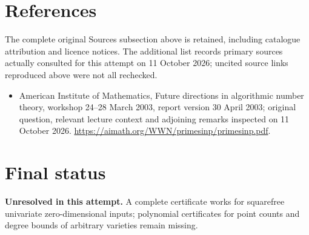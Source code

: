 \documentclass[11pt]{article}
\begin{document}
\section{References}
The complete original Sources subsection above is retained, including catalogue attribution and licence notices. The additional list records primary sources actually consulted for this attempt on 11 October 2026; uncited source links reproduced above were not all rechecked.
\begin{itemize}
\item American Institute of Mathematics, Future directions in algorithmic number theory, workshop 24--28 March 2003, report version 30 April 2003; original question, relevant lecture context and adjoining remarks inspected on 11 October 2026. \url{https://aimath.org/WWN/primesinp/primesinp.pdf}.
\end{itemize}
\section{Final status}
\textbf{Unresolved in this attempt.} A complete certificate works for squarefree univariate zero-dimensional inputs; polynomial certificates for point counts and degree bounds of arbitrary varieties remain missing.
\end{document}
